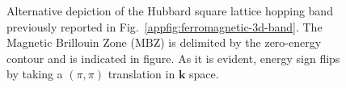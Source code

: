 \begin{figure}
	\centering
	\caption{Alternative depiction of the Hubbard square lattice hopping band previously reported in Fig.~\ref{appfig:ferromagnetic-3d-band}. The Magnetic Brillouin Zone ($\mathrm{MBZ}$) is delimited by the zero-energy contour and is indicated in figure. As it is evident, energy sign flips by taking a $(\pi,\pi)$ translation in $\mathbf{k}$ space.}
	\label{appfig:alternative-ferromagnetic-band}
\end{figure}

